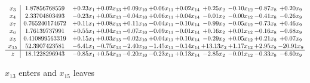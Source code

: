 \documentclass[9pt]{article}
\begin{document}
 \[\begin{array}{c| c c@{\hskip 2pt} c@{\hskip 2pt} c@{\hskip 2pt} c@{\hskip 2pt} c@{\hskip 2pt} c@{\hskip 2pt} c@{\hskip 2pt} c@{\hskip 2pt} c@{\hskip 2pt} }
 x_{3}   &  1.87856768559 & +  0.23 x_{1} & +  0.02 x_{13} & +  0.09 x_{10} & +  0.06 x_{11} & +  0.02 x_{14} & +  0.25 x_{2} & -0.10 x_{12} & -0.87 x_{8} & +  0.20 x_{9}\\
 x_{4}   &  2.33704803493 & -0.23 x_{1} & +  0.05 x_{13} & -0.04 x_{10} & +  0.06 x_{11} & +  0.04 x_{14} & -0.01 x_{2} & -0.00 x_{12} & -0.41 x_{8} & -0.26 x_{9}\\
 x_{7}   &  0.765240174672 & +  0.11 x_{1} & +  0.08 x_{13} & +  0.11 x_{10} & -0.04 x_{11} & -0.10 x_{14} & -0.99 x_{2} & -0.05 x_{12} & -0.73 x_{8} & +  0.46 x_{9}\\
 x_{6}   &  1.76139737991 & +  0.55 x_{1} & +  0.04 x_{13} & -0.07 x_{10} & -0.09 x_{11} & -0.01 x_{14} & +  0.16 x_{2} & +  0.01 x_{12} & -0.16 x_{8} & -0.68 x_{9}\\
 x_{5}   &  0.410899563319 & +  0.15 x_{1} & +  0.03 x_{13} & -0.02 x_{10} & +  0.04 x_{11} & +  0.10 x_{14} & -0.29 x_{2} & +  0.05 x_{12} & +  0.21 x_{8} & +  0.07 x_{9}\\
 x_{15}   &  52.3907423581 & -6.41 x_{1} & -0.75 x_{13} & -2.40 x_{10} & -1.45 x_{11} & -0.14 x_{14} & + 13.13 x_{2} & +  1.17 x_{12} & +  2.95 x_{8} & -20.91 x_{9}\\
\hline
z    &  18.1228296943 & -0.85 x_{1} & +  0.54 x_{13} & -0.20 x_{10} & -0.23 x_{11} & +  0.13 x_{14} & -2.85 x_{2} & -0.01 x_{12} & -0.33 x_{8} & -6.60 x_{9}\\
\end{array}\]


 $ x_{13} $ enters and $ x_{15} $ leaves 
\end{document}
